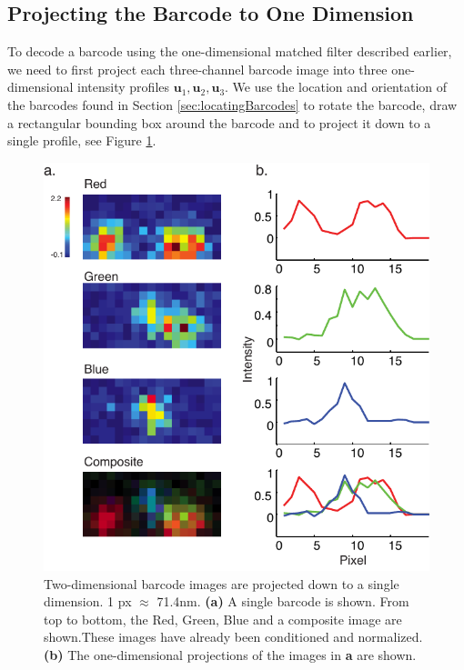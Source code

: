    
\subsection{Projecting the Barcode to One Dimension} \label{sec:projectDown}
	To decode a barcode using the one-dimensional matched filter described earlier, we need to first project each three-channel barcode image into three one-dimensional intensity profiles $\mathbf{u}_1, \mathbf{u}_2, \mathbf{u}_3$.  We use the location and orientation of the barcodes found in Section \ref{sec:locatingBarcodes} to rotate the barcode, draw a rectangular bounding box around the barcode and to project it down to a single profile, see Figure \ref{fig:projectDown}.


	\begin{figure}[htbp]
	\begin{center}
		\includegraphics[width=\textwidth]{figures/theoryProjectBarcode}
		\caption{Two-dimensional barcode images are projected down to a single dimension. 1 px $\approx$ 71.4nm. \textbf{(a)}  A single barcode is shown. From top to bottom, the Red, Green,  Blue and a composite image are shown.These images have already been conditioned and normalized. \textbf{(b)} The one-dimensional projections of the images in \textbf{a} are shown. \label{fig:projectDown}}
	\end{center}	
	\end{figure}



